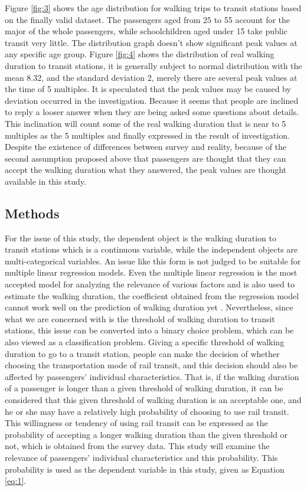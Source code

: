 \documentclass[Journal,letterpaper]{ascelike-new}
\begin{document}
Figure \ref{fig:3} shows the age distribution for walking trips to transit stations based on the finally valid dataset. The passengers aged from 25 to 55 account for the major of the whole passengers, while schoolchildren aged under 15 take public transit very little. The distribution graph doesn't show significant peak values at any specific age group. Figure \ref{fig:4} shows the distribution of real walking duration to transit stations, it is generally subject to normal distribution with the mean 8.32, and the standard deviation 2, merely there are several peak values at the time of 5 multiples. It is speculated that the peak values may be caused by deviation occurred in the investigation. Because it seems that people are inclined to reply a looser answer when they are being asked some questions about details. This inclination will count some of the real walking duration that is near to 5 multiples as the 5 multiples and finally expressed in the result of investigation. Despite the existence of differences between survey and reality, because of the second assumption proposed above that passengers are thought that they can accept the walking duration what they answered, the peak values are thought available in this study.

%
\subsection{Methods}
For the issue of this study, the dependent object is the walking duration to transit stations which is a continuous variable, while the independent objects are multi-categorical variables. An issue like this form is not judged to be suitable for multiple linear regression models. Even the multiple linear regression is the most accepted model for analyzing the relevance of various factors and is also used to estimate the walking duration, the coefficient obtained from the regression model cannot work well on the prediction of walking duration yet \cite{Krygsman2004}. Nevertheless, since what we are concerned with is the threshold of walking duration to transit stations, this issue can be converted into a binary choice problem, which can be also viewed as a classification problem. Giving a specific threshold of walking duration to go to a transit station, people can make the decision of whether choosing the transportation mode of rail transit, and this decision should also be affected by passengers' individual characteristics. That is, if the walking duration of a passenger is longer than a given threshold of walking duration, it can be considered that this given threshold of walking duration is an acceptable one, and he or she may have a relatively high probability of choosing to use rail transit. This willingness or tendency of using rail transit can be expressed as the probability of accepting a longer walking duration than the given threshold or not, which is obtained from the survey data. This study will examine the relevance of passengers' individual characteristics and this probability. This probability is used as the dependent variable in this study, given as Equation \ref{eq:1}.
\end{document}
